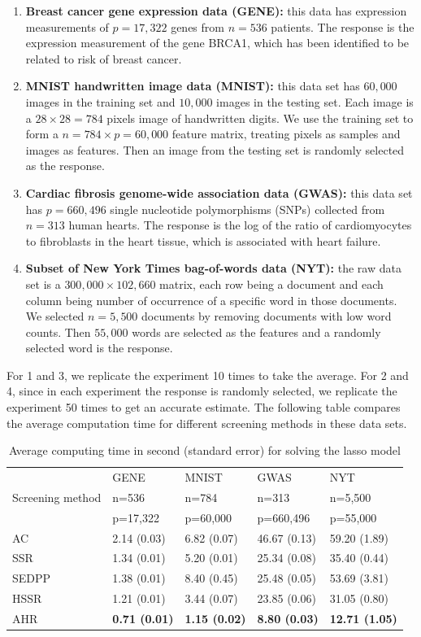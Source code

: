 \begin{enumerate}
    \item \textbf{Breast cancer gene expression data
(GENE):} this data has expression measurements of $p=17,322$ genes from $n=536$ patients. The response is the expression measurement of the gene BRCA1, which has been identified to be related to risk of breast cancer.
    \item \textbf{MNIST handwritten image data
(MNIST):} this data set has $60,000$ images in the training set and $10,000$ images in the testing set. Each image is a $28\times 28=784$ pixels image of handwritten digits. We use the training set to form a $n=784\times p=60,000$ feature matrix, treating pixels as samples and images as features. Then an image from the testing set is randomly selected as the response.
    \item \textbf{ Cardiac fibrosis genome-wide association data
(GWAS):} this data set has $p=660,496$ single nucleotide
polymorphisms (SNPs) collected from $n=313$ human hearts. The response is the log of the ratio of cardiomyocytes to fibroblasts in the heart tissue, which is associated with heart failure.
    \item \textbf{Subset of New York Times bag-of-words data
(NYT):} the raw data set is a $300,000\times 102,660$ matrix, each row being a document and each column being number of occurrence of a specific word in those documents. We selected $n=5,500$ documents by removing documents with low word counts. Then $55,000$ words are selected as the features and a randomly selected word is the response.

\end{enumerate}


For 1 and 3, we replicate the experiment 10 times to take the average. For 2 and 4, since in each experiment the response is randomly selected, we replicate the experiment 50 times to get an accurate estimate. The following table compares the average computation time for different screening methods in these data sets.

\begin{table}[H]
\centering
\begin{tabular}{l|l|l|l|l}
\hline
 & GENE & MNIST & GWAS & NYT \\
Screening method & n=536 & n=784 & n=313 & n=5,500 \\
 & p=17,322 & p=60,000 & p=660,496 & p=55,000 \\ \hline
AC & 2.14 (0.03) & 6.82 (0.07) & 46.67 (0.13) & 59.20 (1.89) \\
SSR & 1.34 (0.01) & 5.20 (0.01) & 25.34 (0.08) & 35.40 (0.44) \\
SEDPP & 1.38 (0.01) & 8.40 (0.45) & 25.48 (0.05) & 53.69 (3.81) \\
HSSR & 1.21 (0.01) & 3.44 (0.07) & 23.85 (0.06) & 31.05 (0.80) \\
AHR & \textbf{0.71 (0.01)} & \textbf{1.15 (0.02)} & \textbf{8.80 (0.03)} & \textbf{12.71 (1.05)} \\\hline
\end{tabular}
\caption{Average computing time in second (standard error) for solving the lasso model}
\end{table}


